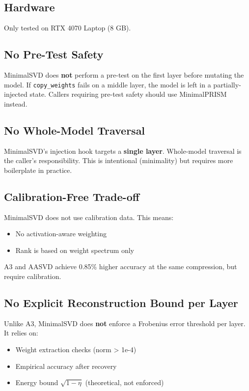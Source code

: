\subsection{Hardware}

Only tested on RTX 4070 Laptop (8 GB).

\subsection{No Pre-Test Safety}

MinimalSVD does \textbf{not} perform a pre-test on the first layer before mutating 
the model. If \texttt{copy\_weights} fails on a middle layer, the model is left in a 
partially-injected state. Callers requiring pre-test safety should use 
MinimalPRISM instead.

\subsection{No Whole-Model Traversal}

MinimalSVD's injection hook targets a \textbf{single layer}. Whole-model 
traversal is the caller's responsibility. This is intentional (minimality) 
but requires more boilerplate in practice.

\subsection{Calibration-Free Trade-off}

MinimalSVD does not use calibration data. This means:
\begin{itemize}
\item No activation-aware weighting
\item Rank is based on weight spectrum only

\end{itemize}
A3 and AASVD achieve 0.85\% higher accuracy at the same compression, 
but require calibration.

\subsection{No Explicit Reconstruction Bound per Layer}

Unlike A3, MinimalSVD does \textbf{not} enforce a Frobenius error threshold per 
layer. It relies on:
\begin{itemize}
\item Weight extraction checks (norm \textgreater{} 1e-4)
\item Empirical accuracy after recovery
\item Energy bound $\sqrt{1 - \eta}$ (theoretical, not enforced)

\end{itemize}
